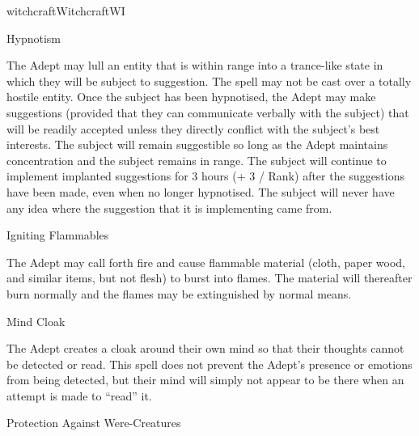 \begin{College}[1.1]{witchcraft}{Witchcraft}{WI}
\begin{spell}[G-6]{Hypnotism}
\begin{effects}
The Adept may lull an entity that is within range into a trance-like
state in which they will be subject to suggestion.  The spell may not
be cast over a totally hostile entity.  Once the subject has been
hypnotised, the Adept may make suggestions (provided that they can
communicate verbally with the subject) that will be readily accepted
unless they directly conflict with the subject’s best interests.  The
subject will remain suggestible so long as the Adept maintains
concentration and the subject remains in range.  The subject will
continue to implement implanted suggestions for 3 hours (+ 3 / Rank)
after the suggestions have been made, even when no longer hypnotised.
The subject will never have any idea where the suggestion that it is
implementing came from.
\end{effects}
\end{spell}

\begin{spell}[G-7]{Igniting Flammables}

\begin{effects}
The Adept may call forth fire and cause flammable material (cloth,
paper wood, and similar items, but not flesh) to burst into flames.
The material will thereafter burn normally and the flames may be
extinguished by normal means.
\end{effects}
\end{spell}

\begin{spell}[G-8]{Mind Cloak}

\begin{effects}
The Adept creates a cloak around their own mind so that their thoughts
cannot be detected or read.  This spell does not prevent the Adept’s
presence or emotions from being detected, but their mind will simply
not appear to be there when an attempt is made to “read” it.
\end{effects}
\end{spell}

\begin{spell}[G-9]{Protection Against Were-Creatures}


\end{spell}
\end{College}
